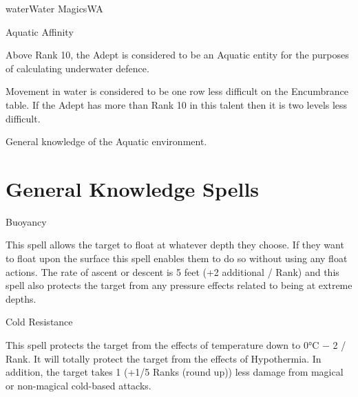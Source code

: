 \begin{College}[1.3]{water}{Water Magics}{WA}
\begin{talent}[T-3]{Aquatic Affinity}
\begin{effects}
\begin{Enumerate}
\item Above Rank 10, the Adept is considered to be an Aquatic entity
  for the purposes of calculating underwater defence.

\item Movement in water is considered to be one row less difficult on
  the Encumbrance table.  If the Adept has more than Rank 10 in this
  talent then it is two levels less difficult.

\item General knowledge of the Aquatic environment. 
\end{Enumerate}
\end{effects}
\end{talent}


\section{General Knowledge Spells}

\begin{spell}[G-1]{Buoyancy}

\begin{effects}
This spell allows the target to float at whatever depth they choose.
If they want to float upon the surface this spell enables them to do
so without using any float actions.  The rate of ascent or descent is
5 feet (+2 additional / Rank) and this spell also protects the target
from any pressure effects related to being at extreme depths.
\end{effects}
\end{spell}

\begin{spell}[G-2]{Cold Resistance}

\begin{effects}
This spell protects the target from the effects of temperature down to
0°C − 2 / Rank.  It will totally protect the target from the effects
of Hypothermia.  In addition, the target takes 1 (+1/5 Ranks (round
up)) less damage from magical or non-magical cold-based attacks.
\end{effects}
\end{spell}


\end{College}

